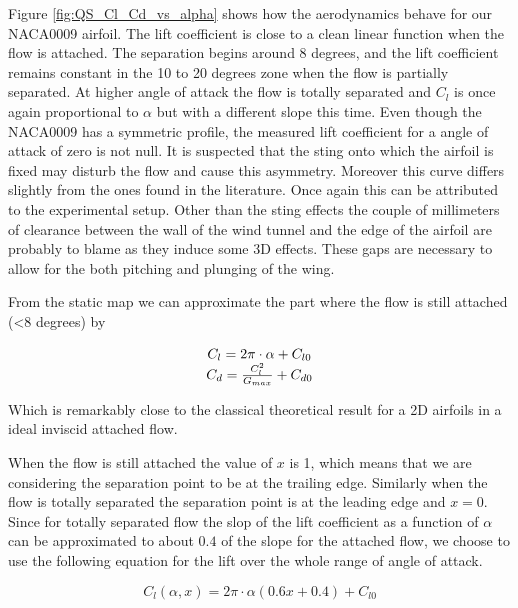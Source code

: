 \par Figure \ref{fig:QS_Cl_Cd_vs_alpha} shows how the aerodynamics behave for our NACA0009 airfoil.
The lift coefficient is close to a clean linear function when the flow is attached.
The separation begins around 8 degrees, and the lift coefficient remains constant in the 10 to 20 degrees zone when the flow is partially separated.
At higher angle of attack the flow is totally separated and $C_l$ is once again proportional to $\alpha$ but with a different slope this time.
Even though the NACA0009 has a symmetric profile, the measured lift coefficient for a angle of attack of zero is not null.
It is suspected that the sting onto which the airfoil is fixed may disturb the flow and cause this asymmetry.
Moreover this curve differs slightly from the ones found in the literature.
Once again this can be attributed to the experimental setup.
Other than the sting effects the couple of millimeters of clearance between the wall of the wind tunnel and the edge of the airfoil are probably to blame as they induce some 3D effects.
These gaps are necessary to allow for the both pitching and plunging of the wing.

\par From the static map we can approximate the part where the flow is still attached (<8 degrees) by 

\begin{equation}
  \begin{array}[c]{c}
    C_l= 2 \pi \cdot \alpha + C_{l0} \\
    C_d= \frac{C_l^2}{G_{max}} + C_{d0}
  \end{array}
  \label{eqn:attached_Cl_and_Cd_vs_alpha}
\end{equation}

Which is remarkably close to the classical theoretical result for a 2D airfoils in a ideal inviscid attached flow.

When the flow is still attached the value of $x$ is 1, which means that we are considering the separation point to be at the trailing edge.
Similarly when the flow is totally separated the separation point is at the leading edge and $x=0$.
Since for totally separated flow the slop of the lift coefficient as a function of $\alpha$ can be approximated to about $0.4$ of the slope for the attached flow, we choose to use the following equation for the lift over the whole range of angle of attack. 

\begin{equation}
  C_l(\alpha,x)=2 \pi \cdot \alpha (0.6 x + 0.4) + C_{l0}
  \label{eqn:Cl_function}
\end{equation}

